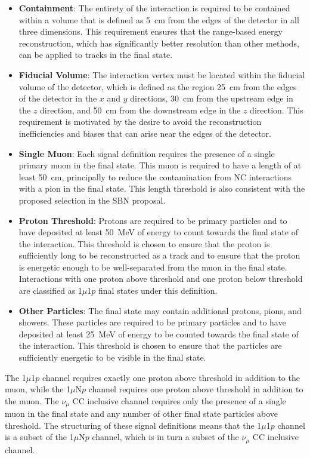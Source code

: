 \begin{itemize}
    \item \textbf{Containment}: The entirety of the interaction is required to be contained within a volume that is defined as \qty[mode=text]{5}{cm} from the edges of the detector in all three dimensions. This requirement ensures that the range-based energy reconstruction, which has significantly better resolution than other methods, can be applied to tracks in the final state.
    \item \textbf{Fiducial Volume}: The interaction vertex must be located within the fiducial volume of the detector, which is defined as the region \qty[mode=text]{25}{cm} from the edges of the detector in the $x$ and $y$ directions, \qty[mode=text]{30}{cm} from the upstream edge in the $z$ direction, and \qty[mode=text]{50}{cm} from the downstream edge in the $z$ direction. This requirement is motivated by the desire to avoid the reconstruction inefficiencies and biases that can arise near the edges of the detector.
    \item \textbf{Single Muon}: Each signal definition requires the presence of a single primary muon in the final state. This muon is required to have a length of at least \qty[mode=text]{50}{cm}, principally to reduce the contamination from NC interactions with a pion in the final state. This length threshold is also consistent with the proposed selection in the SBN proposal.
    \item \textbf{Proton Threshold}: Protons are required to be primary particles and to have deposited at least \qty[mode=text]{50}{MeV} of energy to count towards the final state of the interaction. This threshold is chosen to ensure that the proton is sufficiently long to be reconstructed as a track and to ensure that the proton is energetic enough to be well-separated from the muon in the final state. Interactions with one proton above threshold and one proton below threshold are classified as 1$\mu$1$p$ final states under this definition.
    \item \textbf{Other Particles}: The final state may contain additional protons, pions, and showers. These particles are required to be primary particles and to have deposited at least \qty[mode=text]{25}{MeV} of energy to be counted towards the final state of the interaction. This threshold is chosen to ensure that the particles are sufficiently energetic to be visible in the final state.
\end{itemize}

The 1$\mu$1$p$ channel requires exactly one proton above threshold in addition to the muon, while the 1$\mu$N$p$ channel requires  one proton above threshold in addition to the muon. The $\nu_\mu$ CC inclusive channel requires only the presence of a single muon in the final state and any number of other final state particles above threshold. The structuring of these signal definitions means that the 1$\mu$1$p$ channel is a subset of the 1$\mu$N$p$ channel, which is in turn a subset of the $\nu_\mu$ CC inclusive channel. 


